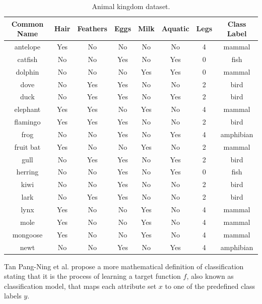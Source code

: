 \begin{table}[!htp]
\centering
\begin{tabular}{ |c|c|c|c|c|c|c|c| }
\hline
Common Name & Hair & Feathers & Eggs & Milk & Aquatic & Legs & Class Label \\ \hline
antelope & Yes & No & No & No & No & 4 & mammal \\ \hline
catfish & No & No & Yes & No & Yes & 0 & fish \\ \hline
dolphin & No & No & No & Yes & Yes & 0 & mammal \\ \hline
dove & No & Yes & Yes & No & No & 2 & bird \\ \hline
duck & No & Yes & Yes & No & Yes & 2 & bird \\ \hline
elephant & Yes & Yes & No & Yes & No & 4 & mammal \\ \hline
flamingo & Yes & Yes & Yes & No & No & 2 & bird \\ \hline
frog & No & No & Yes & No & Yes & 4 & amphibian \\ \hline
fruit bat & Yes & No & No & Yes & No & 2 & mammal \\ \hline
gull & No & Yes & Yes & No & Yes & 2 & bird \\ \hline
herring & No & No & Yes & No & Yes & 0 & fish \\ \hline
kiwi & No & No & Yes & No & No & 2 & bird \\ \hline
lark & No & Yes & Yes & No & No & 2 & bird \\ \hline
lynx & Yes & No & No & Yes & No & 4 & mammal \\ \hline
mole & Yes & No & No & Yes & No & 4 & mammal \\ \hline
mongoose & Yes & No & No & Yes & No & 4 & mammal \\ \hline
newt & No & No & Yes & No & Yes & 4 & amphibian \\
\hline
\end{tabular}
\caption{Animal kingdom dataset.}
\label{tab:clasiffication_table}
\end{table}

Tan Pang-Ning et al. propose a more mathematical definition of classification stating that it is the process of learning a target function $f$, also known as classification model, that maps each attribute set $x$ to one of the predefined class labels $y$.

